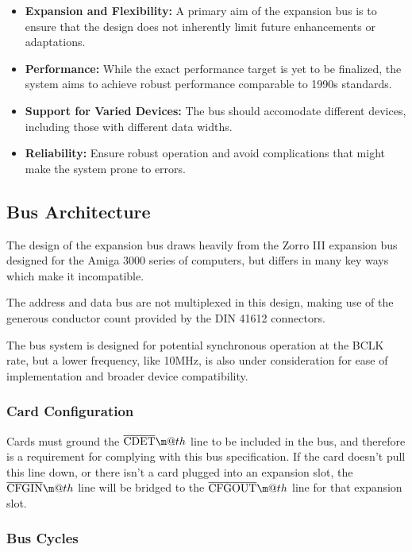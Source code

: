 \documentclass{article}
\makeatletter
\newcommand*{\textoverline}[1]{$\overline{\hbox{#1}}\m@th$}
\makeatother
\begin{document}
\begin{itemize}
	\item \textbf{Expansion and Flexibility:} A primary aim of the expansion
	bus is to ensure that the design does not inherently limit future
	enhancements or adaptations.

	\item \textbf{Performance:} While the exact performance target is yet to
	be finalized, the system aims to achieve robust performance comparable
	to 1990s standards.

	\item \textbf{Support for Varied Devices:} The bus should accomodate
	different devices, including those with different data widths.

	\item \textbf{Reliability:} Ensure robust operation and avoid
	complications that might make the system prone to errors.
\end{itemize}

\subsection{Bus Architecture}

The design of the expansion bus draws heavily from the Zorro III expansion bus
designed for the Amiga 3000 series of computers, but differs in many key ways
which make it incompatible.

The address and data bus are not multiplexed in this design, making use of the
generous conductor count provided by the DIN 41612 connectors.

The bus system is designed for potential synchronous operation at the BCLK rate,
but a lower frequency, like 10MHz, is also under consideration for ease of
implementation and broader device compatibility.

\subsubsection{Card Configuration}

Cards must ground the \textoverline{CDET} line to be included in the
bus, and therefore is a requirement for complying with this bus specification.
If the card doesn't pull this line down, or there isn't a card plugged into an
expansion slot, the \textoverline{CFGIN} line will be bridged to the
\textoverline{CFGOUT} line for that expansion slot.

\subsubsection{Bus Cycles}
\end{document}
